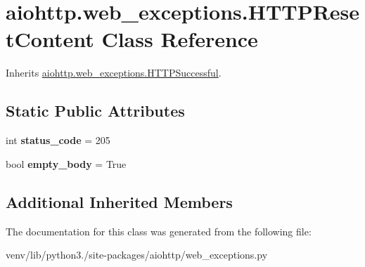 \hypertarget{classaiohttp_1_1web__exceptions_1_1_h_t_t_p_reset_content}{}\section{aiohttp.\+web\+\_\+exceptions.\+H\+T\+T\+P\+Reset\+Content Class Reference}
\label{classaiohttp_1_1web__exceptions_1_1_h_t_t_p_reset_content}


Inherits \hyperlink{classaiohttp_1_1web__exceptions_1_1_h_t_t_p_successful}{aiohttp.\+web\+\_\+exceptions.\+H\+T\+T\+P\+Successful}.

\subsection*{Static Public Attributes}
\begin{DoxyCompactItemize}
\item 
\mbox{\label{classaiohttp_1_1web__exceptions_1_1_h_t_t_p_reset_content_a5547c0bdeeaaf77ce0b21e40c07643eb}} 
int {\bfseries status\+\_\+code} = 205
\item 
\mbox{\label{classaiohttp_1_1web__exceptions_1_1_h_t_t_p_reset_content_a6ce7b87ebbb5288e0ca2a4ae14224fc5}} 
bool {\bfseries empty\+\_\+body} = True
\end{DoxyCompactItemize}
\subsection*{Additional Inherited Members}


The documentation for this class was generated from the following file\+:\begin{DoxyCompactItemize}
\item 
venv/lib/python3./site-\/packages/aiohttp/web\+\_\+exceptions.\+py\end{DoxyCompactItemize}

